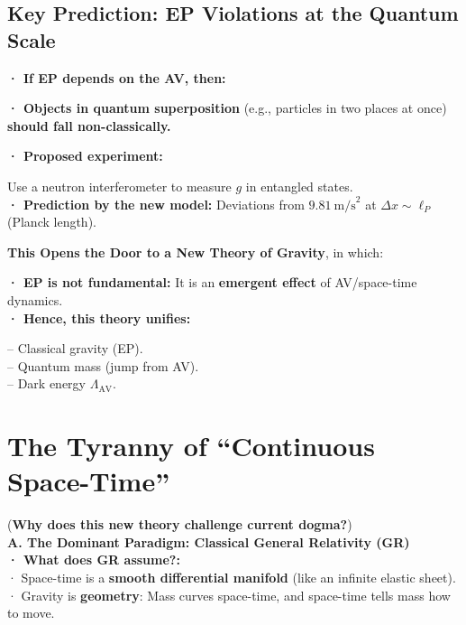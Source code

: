 \documentclass[a4paper]{article}
\theoremstyle{definition}
\theoremstyle{remark}
\numberwithin{equation}{section}
\begin{document}
	\subsection{Key Prediction: EP Violations at the Quantum Scale}
	
	\textbf{· If EP depends on the AV, then:}
	
	\textbf{· Objects in quantum superposition} (e.g., particles in two places at once) \textbf{should fall non-classically.}
	
	\textbf{· Proposed experiment:}
	
	Use a neutron interferometer to measure \(g\) in entangled states.\\
	
	\textbf{· Prediction by the new model:} Deviations from \(9.81 \ \text{m/s}^2\) at \(\Delta x \sim \ell_P\) (Planck length).
	
	\textbf{This Opens the Door to a New Theory of Gravity}, in which:
	
	\textbf{· EP is not fundamental:} It is an \textbf{emergent effect} of AV/space-time dynamics.\\
	
	\textbf{· Hence, this theory unifies:}
	
	– Classical gravity (EP).\\
	
	– Quantum mass (jump from AV).\\
	
	– Dark energy \(\Lambda_{\text{AV}}\).
	
	
\section{The Tyranny of ``Continuous Space-Time''}

(\textbf{Why does this new theory challenge current dogma?})\\

\textbf{A. The Dominant Paradigm: Classical General Relativity (GR)}\\

\textbf{· What does GR assume?:}\\

· Space-time is a \textbf{smooth differential manifold} (like an infinite elastic sheet).\\

· Gravity is \textbf{geometry}: Mass curves space-time, and space-time tells mass how to move.\\
\end{document}
